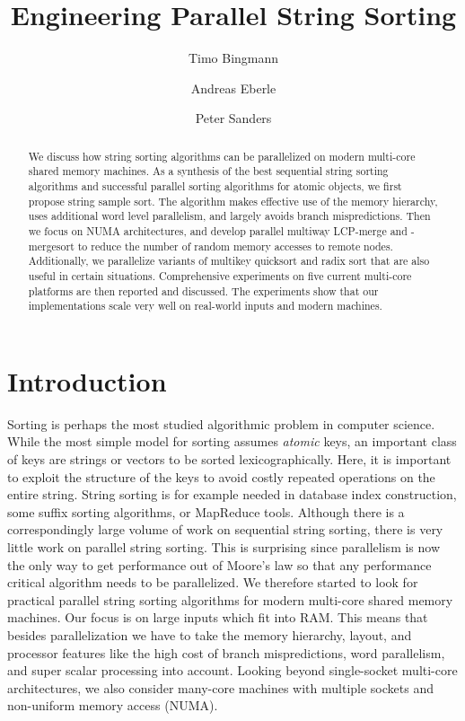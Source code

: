 \documentclass[a4paper]{myjournal}
\begin{document}
\title{Engineering Parallel String Sorting}

\author{Timo Bingmann \and Andreas Eberle \and Peter Sanders}






\maketitle

\begin{abstract}
  We discuss how string sorting algorithms can be parallelized on modern
  multi-core shared memory machines.  As a synthesis of the best sequential
  string sorting algorithms and successful parallel sorting algorithms for
  atomic objects, we first propose string sample sort. The algorithm makes
  effective use of the memory hierarchy, uses additional word level parallelism,
  and largely avoids branch mispredictions. Then we focus on NUMA architectures,
  and develop parallel multiway LCP-merge and -mergesort to reduce the number of
  random memory accesses to remote nodes.  Additionally, we parallelize variants
  of multikey quicksort and radix sort that are also useful in certain
  situations. Comprehensive experiments on five current multi-core platforms are
  then reported and discussed. The experiments show that our implementations
  scale very well on real-world inputs and modern machines.
\end{abstract}

\section{Introduction}

Sorting is perhaps the most studied algorithmic problem in computer science.
While the most simple model for sorting assumes \emph{atomic} keys, an important
class of keys are strings or vectors to be sorted lexicographically. Here, it is important
to exploit the structure of the keys to avoid costly repeated operations on the
entire string.  String sorting is for example needed in database index
construction, some suffix sorting algorithms, or MapReduce tools. Although there
is a correspondingly large volume of work on sequential string sorting, there is
very little work on parallel string sorting. This is surprising since
parallelism is now the only way to get performance out of Moore's law so that
any performance critical algorithm needs to be parallelized. We therefore
started to look for practical parallel string sorting algorithms for modern
multi-core shared memory machines. Our focus is on large inputs which fit into
RAM.  This means that besides parallelization we have to take the memory
hierarchy, layout, and processor features like the high cost of branch
mispredictions, word parallelism, and super scalar processing into account.
Looking beyond single-socket multi-core architectures, we also consider
many-core machines with multiple sockets and non-uniform memory access (NUMA).
\end{document}
